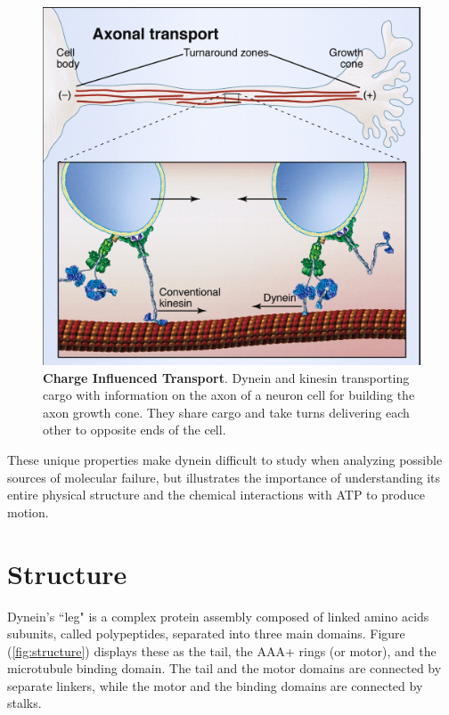 \begin{figure}[H]
	\centering
	\includegraphics[width=0.6\columnwidth]{Figures/retrograde_transport.jpg}
	\caption[Charge Influenced Transport]{\textbf{Charge Influenced Transport}. Dynein and kinesin transporting cargo with information on the axon of a neuron cell for building the axon growth cone. They share cargo and take turns delivering each other to opposite ends of the cell. \cite{Vale2003molecular}}
	\label{fig:transport}
\end{figure}

These unique properties make dynein difficult to study when analyzing possible sources of molecular failure, but illustrates the importance of understanding its entire physical structure and the chemical interactions with ATP to produce motion.

\newpage
\section{Structure}

Dynein's ``leg" is a complex protein assembly composed of linked amino acids subunits, called polypeptides, separated into three main domains. Figure (\ref{fig:structure}) displays these as the tail, the AAA+ rings (or motor), and the microtubule binding domain. The tail and the motor domains are connected by separate linkers, while the motor and the binding domains are connected by stalks.

